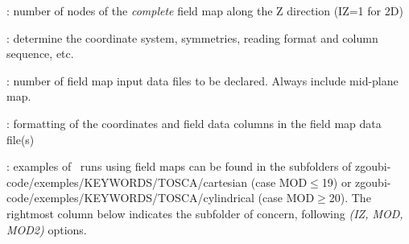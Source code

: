 
 : number of nodes of the \textsl{complete} field map along the Z direction (IZ=1 for 2D)

 : determine the coordinate system,  symmetries, reading format and column sequence,  etc.

 : number of field map input data files to be declared. Always include mid-plane map.

 : formatting of the coordinates and field data columns in the field map data file(s) 

 : examples of \zgoubi\ runs using field maps can be found in the subfolders 
of zgoubi-code/exemples/KEYWORDS/TOSCA/cartesian (case MOD$\leq$19) or  zgoubi-code/exemples/KEYWORDS/TOSCA/cylindrical (case MOD$\geq$20). The rightmost column  below 
indicates the  subfolder of concern, following \textsl{(IZ, MOD, MOD2)} options. 

\centering

\renewcommand{\arraystretch}{1}

